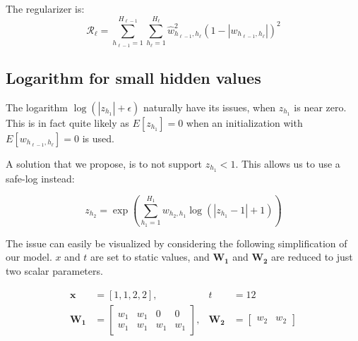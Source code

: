 \documentclass[a4paper]{article}
\begin{document}
The regularizer is:
\begin{equation}
\mathcal{R_\ell} = \sum_{h_{\ell-1}=1}^{H_{\ell-1}} \sum_{h_{\ell}=1}^{H_{\ell}} \hat{w}_{h_{\ell-1},h_\ell}^2 (1 - |w_{h_{\ell-1},h_\ell}|)^2 
\end{equation}

\subsection{Logarithm for small hidden values}

The logarithm $\log(|z_{h_1}| + \epsilon)$ naturally have its issues, when $z_{h_1}$ is near zero. This is in fact quite likely as $E[z_{h_1}] = 0$ when an initialization with $E[w_{h_{\ell-1},h_\ell}] = 0$ is used.

A solution that we propose, is to not support $z_{h_1} < 1$. This allows us to use a safe-log instead:   

\begin{equation}
z_{h_2} = \exp\left(\sum_{h_1=1}^{H_1} w_{h_2, h_1} \log(|z_{h_1} - 1| + 1) \right)
\end{equation}

The issue can easily be visualized by considering the following simplification of our model. $x$ and $t$ are set to static values, and $\mathbf{W_1}$ and $\mathbf{W_2}$ are reduced to just two scalar parameters.

\begin{equation*}
\begin{aligned}
\mathbf{x} &= [1, 1, 2, 2],& t &= 12 \\
\mathbf{W_1} &= \begin{bmatrix}
w_1 & w_1 & 0 & 0 \\
w_1 & w_1 & w_1 & w_1
\end{bmatrix},& 
\mathbf{W_2} &= \begin{bmatrix}
w_2 & w_2
\end{bmatrix}
\end{aligned}
\end{equation*}
\end{document}
